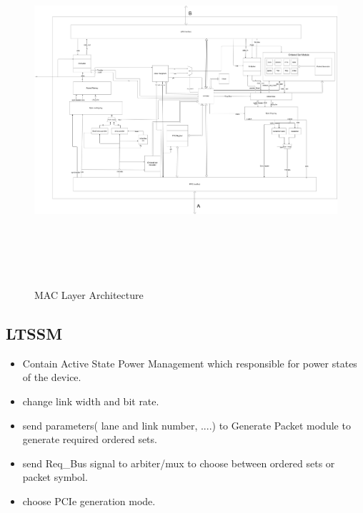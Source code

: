   \begin{figure}[H]
  \centering
  \includegraphics[width=130mm,height=130mm]{images/design-abstract (1).png}
  \caption{MAC Layer Architecture}
  
  \label{fig:arch}
\end{figure}

\subsection{LTSSM}
 \begin{itemize}
     \item Contain Active State Power Management which responsible for power states of the device.
     \item change link width and bit rate. 
     \item send parameters( lane and link number, ....) to Generate Packet module to generate required ordered sets. 
     \item send Req\_Bus signal to arbiter/mux to choose between ordered sets or packet symbol.
     \item choose PCIe generation mode.
 \end{itemize}
 
